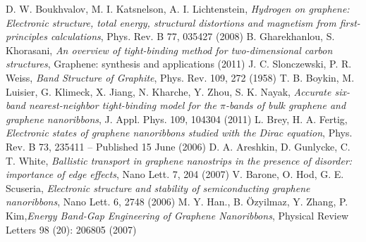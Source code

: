 \begin{thebibliography}{99}
 D. W. Boukhvalov, M. I. Katsnelson, A. I. Lichtenstein, \textit{Hydrogen on graphene: Electronic structure, total energy, structural distortions and magnetism
from first-principles calculations}, Phys. Rev. B 77, 035427 (2008)
 B. Gharekhanlou, S. Khorasani, \textit{An overview of tight-binding method for two-dimensional carbon structures}, Graphene: synthesis and applications (2011)
 J. C. Slonczewski, P. R. Weiss, \textit{Band Structure of Graphite}, Phys. Rev. 109, 272 (1958)
 T. B. Boykin, M. Luisier, G. Klimeck, X. Jiang, N. Kharche, Y. Zhou, S. K. Nayak, \textit{Accurate six-band nearest-neighbor tight-binding model for the $\pi$-bands of bulk graphene and graphene nanoribbons}, J. Appl. Phys. 109, 104304 (2011)
 L. Brey, H. A. Fertig, \textit{Electronic states of graphene nanoribbons studied with the Dirac equation}, Phys. Rev. B 73, 235411 – Published 15 June (2006)
 D. A. Areshkin, D. Gunlycke, C. T. White, \textit{Ballistic transport in graphene nanostrips in the presence of disorder: importance of edge effects}, Nano Lett. 7, 204 (2007)
 V. Barone, O. Hod, G. E. Scuseria, \textit{Electronic structure and stability of semiconducting graphene nanoribbons}, Nano Lett. 6, 2748 (2006)
 M. Y. Han., B. Özyilmaz, Y. Zhang, P. Kim,\textit{Energy Band-Gap Engineering of Graphene Nanoribbons}, Physical Review Letters 98 (20): 206805 (2007)
\end{thebibliography}
